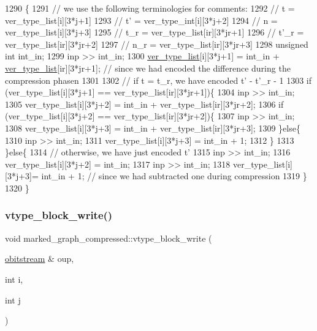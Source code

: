 \begin{DoxyCode}
1290                                                                                            \{
1291   \textcolor{comment}{// we use the following terminologies for comments:}
1292   \textcolor{comment}{// t = ver\_type\_list[i][3*j+1]}
1293   \textcolor{comment}{// t' = ver\_type\_int[i][3*j+2]}
1294   \textcolor{comment}{// n = ver\_type\_list[i][3*j+3]}
1295   \textcolor{comment}{// t\_r = ver\_type\_list[ir][3*jr+1]}
1296   \textcolor{comment}{// t'\_r = ver\_type\_list[ir][3*jr+2]}
1297   \textcolor{comment}{// n\_r = ver\_type\_list[ir][3*jr+3]}
1298   \textcolor{keywordtype}{unsigned} \textcolor{keywordtype}{int} int\_in;
1299   inp >> int\_in;
1300   \hyperlink{classmarked__graph__compressed_af2e3e55223d436628a02758dfae88493}{ver\_type\_list}[i][3*j+1] = int\_in + \hyperlink{classmarked__graph__compressed_af2e3e55223d436628a02758dfae88493}{ver\_type\_list}[ir][3*jr+1]; \textcolor{comment}{// since we had
       encoded the difference during the compression phasen}
1301  
1302   \textcolor{comment}{// if t = t\_r, we have encoded t' - t'\_r - 1}
1303   \textcolor{keywordflow}{if} (ver\_type\_list[i][3*j+1] == ver\_type\_list[ir][3*jr+1])\{
1304     inp >> int\_in;
1305     ver\_type\_list[i][3*j+2] = int\_in + ver\_type\_list[ir][3*jr+2];
1306     \textcolor{keywordflow}{if} (ver\_type\_list[i][3*j+2] == ver\_type\_list[ir][3*jr+2])\{
1307       inp >> int\_in; 
1308       ver\_type\_list[i][3*j+3] = int\_in +  ver\_type\_list[ir][3*jr+3];
1309     \}\textcolor{keywordflow}{else}\{
1310       inp >> int\_in; 
1311       ver\_type\_list[i][3*j+3] = int\_in +  1;
1312     \}
1313   \}\textcolor{keywordflow}{else}\{
1314     \textcolor{comment}{// otherwise, we have just encoded t'}
1315     inp >> int\_in;
1316     ver\_type\_list[i][3*j+2] = int\_in;
1317     inp >> int\_in;
1318     ver\_type\_list[i][3*j+3]= int\_in + 1; \textcolor{comment}{// since we had subtracted one during compression}
1319   \}
1320 \}
\end{DoxyCode}
\mbox{\label{classmarked__graph__compressed_a31f9ea72682f9072d0f90faf58a603fe}} 
\subsubsection{\texorpdfstring{vtype\+\_\+block\+\_\+write()}{vtype\_block\_write()}\hspace{0.1cm}{\footnotesize\ttfamily [1/2]}}
{\footnotesize\ttfamily void marked\+\_\+graph\+\_\+compressed\+::vtype\+\_\+block\+\_\+write (\begin{DoxyParamCaption}\item[{\hyperlink{classobitstream}{obitstream} \&}]{oup,  }\item[{int}]{i,  }\item[{int}]{j }\end{DoxyParamCaption})}

